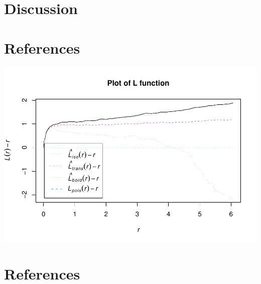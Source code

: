 \documentclass[12pt]{article}
\begin{document}
\hypertarget{discussion}{%
\section{Discussion}\label{discussion}}

\hypertarget{references}{%
\section{References}\label{references}}

\includegraphics{JStevenRaquel_STATS295_Final_files/figure-latex/KL-functions-1.pdf}

\newpage

\hypertarget{references-1}{%
\section{References}\label{references-1}}

\newpage



\end{document}
